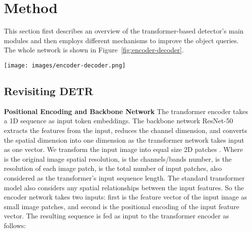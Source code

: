 \documentclass[sn-mathphys]{sn-jnl}\jyear{2021}\theoremstyle{thmstyleone}\newtheorem{theorem}{Theorem}\newtheorem{proposition}[theorem]{Proposition}\theoremstyle{thmstyletwo}\newtheorem{example}{Example}\newtheorem{remark}{Remark}\theoremstyle{thmstylethree}\newtheorem{definition}{Definition}\usepackage{amsmath}
\begin{document}
\section{Method}
\label{sec:method}
This section first describes an overview of the transformer-based detector's main modules and then employs different mechanisms to improve the object queries. The whole network is shown in Figure~\ref{fig:encoder-decoder}.
\begin{figure*}[h]
\centering
\texttt{[image: images/encoder-decoder.png]}
\caption{Presented Transformer-based graphical object detection framework. We divide the input image into small equal-size patches, add position embeddings, and embed the resulting patches along with input multi-scale features to the transformer encoder. We use different forms of object queries such as points, anchor boxes, the addition of positive and negative noises to the anchor boxes in the decoder and observe network performance. Here, blue rectangles represent ground truth (GT), black dots represent points as object queries, brown rectangles denote anchor boxes as object queries, green rectangles indicate positive noised anchor boxes for foreground class, and red rectangles show negative noised anchor boxes for the background class. These object queries are taken as decoder input to provide final graphical object labels and locations.}\label{fig:encoder-decoder}
\end{figure*}
\subsection{Revisiting DETR}
\noindent\textbf {Positional Encoding and Backbone Network}
The transformer encoder takes a 1D sequence as input token embeddings. The backbone network ResNet-50 \cite{resnet45} extracts the features from the input, reduces the channel dimension, and converts the spatial dimension into one dimension as the transformer network takes input as one vector. We transform the input image  into equal size 2D patches . Where  is the original image spatial resolution,  is the channels/bands number,  is the resolution of each image patch,  is the total number of input patches, also considered as the transformer's input sequence length. The standard transformer model also considers any spatial relationships between the input features. So the encoder network takes two inputs: first is the feature vector of the input image as small image patches, and second is the positional encoding of the input feature vector. The resulting sequence  is fed as input to the transformer encoder as follows: 
\setlength{\abovedisplayskip}{3pt}
\setlength{\belowdisplayskip}{3pt}
\end{document}

